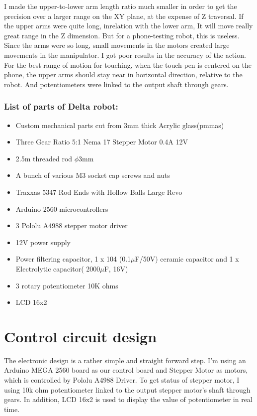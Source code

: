 I made the upper-to-lower arm length ratio much smaller in order to get the precision over a larger range on the XY plane, at the expense of Z traversal. If the upper arms were quite long, inrelation with the lower arm, It will move really great range in the Z dimension. But for a phone-testing robot, this is useless. Since the arms were so long, small movements in the motors created large movements in the manipulator. I got poor results in the accuracy of the action. For the best range of motion for touching, when the touch-pen is centered on the phone, the upper arms should stay near in horizontal direction, relative to the robot.
And potentiometers were linked to the output shaft through gears.

\subsubsection{List of parts of Delta robot:}
\begin{itemize}
		\item Custom mechanical parts cut from 3mm thick Acrylic glass(\glspl{pmma})
		\item Three Gear Ratio 5:1 Nema 17 Stepper Motor 0.4A 12V
		\item 2.5m threaded rod $\phi$3mm
		\item A bunch of various M3 socket cap screws and nuts
		\item Traxxas 5347 Rod Ends with Hollow Balls Large Revo\cite{traxxas_5347_thesis}
		\item Arduino 2560 microcontrollers
		\item 3 Pololu A4988 stepper motor driver
		\item 12V power supply
		\item Power filtering capacitor, 1 x 104 (0.1$\mu$F/50V) ceramic capacitor and 1 x Electrolytic capacitor( 2000$\mu$F, 16V)
		\item 3 rotary potentiometer 10K ohms
		\item LCD 16x2
\end{itemize}


\section{Control circuit design}

The electronic design is a rather simple and straight forward step. I'm using an Arduino MEGA 2560 board as our control board and Stepper Motor as motors, which is controlled by Pololu A4988 Driver. To get status of stepper motor, I using 10k ohm potentiometer linked to the output stepper motor's shaft through gears. In addition, LCD 16x2 is used to display the value of potentiometer in real time.


